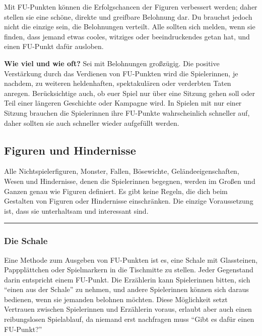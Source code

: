 \documentclass[]{article}
\begin{document}
Mit FU-Punkten können die Erfolgschancen der Figuren verbessert werden;
daher stellen sie eine schöne, direkte und greifbare Belohnung dar. Du
brauchst jedoch nicht die einzige sein, die Belohnungen verteilt. Alle
sollten sich melden, wenn sie finden, dass jemand etwas cooles, witziges
oder beeindruckendes getan hat, und einen FU-Punkt dafür ausloben.

\textbf{Wie viel und wie oft?} Sei mit Belohnungen großzügig. Die
positive Verstärkung durch das Verdienen von FU-Punkten wird die
Spielerinnen, je nachdem, zu weiteren heldenhaften, spektakulären oder
verderbten Taten anregen. Berücksichtige auch, ob euer Spiel nur über
eine Sitzung gehen soll oder Teil einer längeren Geschichte oder
Kampagne wird. In Spielen mit nur einer Sitzung brauchen die
Spielerinnen ihre FU-Punkte wahrscheinlich schneller auf, daher sollten
sie auch schneller wieder aufgefüllt werden.

\subsection{Figuren und Hindernisse}\label{figuren-und-hindernisse}

Alle Nichtspielerfiguren, Monster, Fallen, Bösewichte,
Geländeeigenschaften, Wesen und Hindernisse, denen die Spielerinnen
begegnen, werden im Großen und Ganzen genau wie Figuren definiert. Es
gibt keine Regeln, die dich beim Gestalten von Figuren oder Hindernisse
einschränken. Die einzige Voraussetzung ist, dass sie unterhaltsam und
interessant sind.

\begin{center}\rule{0.5\linewidth}{\linethickness}\end{center}

\subsubsection{Die Schale}\label{die-schale}

Eine Methode zum Ausgeben von FU-Punkten ist es, eine Schale mit
Glassteinen, Pappplättchen oder Spielmarkern in die Tischmitte zu
stellen. Jeder Gegenstand darin entspricht einem FU-Punkt. Die
Erzählerin kann Spielerinnen bitten, sich ``einen aus der Schale'' zu
nehmen, und andere Spielerinnen können sich daraus bedienen, wenn sie
jemanden belohnen möchten. Diese Möglichkeit setzt Vertrauen zwischen
Spielerinnen und Erzählerin voraus, erlaubt aber auch einen
reibungslosen Spielablauf, da niemand erst nachfragen muss ``Gibt es
dafür einen FU-Punkt?''
\end{document}
